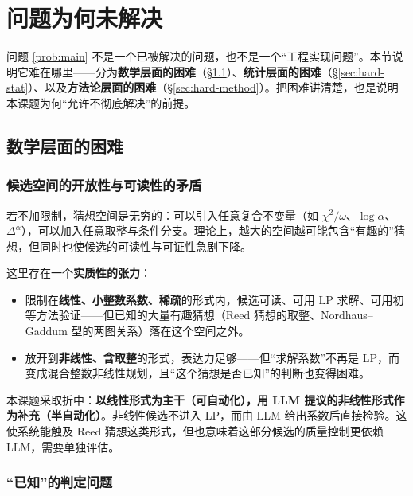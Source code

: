 ﻿%
\section{问题为何未解决}
\label{sec:openness}

问题 \ref{prob:main} 不是一个已被解决的问题，也不是一个“工程实现问题”。本节说明它难在哪里——分为\textbf{数学层面的困难}（\S\ref{sec:hard-math}）、\textbf{统计层面的困难}（\S\ref{sec:hard-stat}）、以及\textbf{方法论层面的困难}（\S\ref{sec:hard-method}）。把困难讲清楚，也是说明本课题为何“允许不彻底解决”的前提。

\subsection{数学层面的困难}
\label{sec:hard-math}

\subsubsection{候选空间的开放性与可读性的矛盾}

若不加限制，猜想空间是无穷的：可以引入任意复合不变量（如 $\chi^2/\omega$、$\log\alpha$、$\Delta^{\alpha}$），可以加入任意取整与条件分支。理论上，越大的空间越可能包含“有趣的”猜想，但同时也使候选的可读性与可证性急剧下降。

这里存在一个\textbf{实质性的张力}：

\begin{itemize}
  \item 限制在\textbf{线性、小整数系数、稀疏}的形式内，候选可读、可用 LP 求解、可用初等方法验证——但已知的大量有趣猜想（Reed 猜想的取整、Nordhaus–Gaddum 型的两图关系）落在这个空间之外。
  \item 放开到\textbf{非线性、含取整}的形式，表达力足够——但“求解系数”不再是 LP，而变成混合整数非线性规划，且“这个猜想是否已知”的判断也变得困难。
\end{itemize}

本课题采取折中：\textbf{以线性形式为主干（可自动化），用 LLM 提议的非线性形式作为补充（半自动化）}。非线性候选不进入 LP，而由 LLM 给出系数后直接检验。这使系统能触及 Reed 猜想这类形式，但也意味着这部分候选的质量控制更依赖 LLM，需要单独评估。

\subsubsection{“已知”的判定问题}

